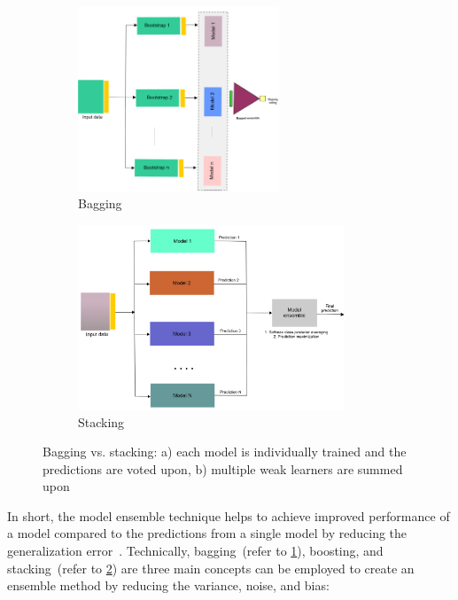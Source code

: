 \begin{figure}[htp!]
	\centering
	\begin{subfigure}{.48\linewidth}
		\centering
		\includegraphics[width=\linewidth,height=55mm]{images/bagging.png}
		\caption{Bagging}
        \label{fig:bagging}
	\end{subfigure}
	\hspace{2mm}
	\begin{subfigure}{0.48\linewidth}
		\centering
		\includegraphics[width=\linewidth,height=55mm]{images/stacking.png}
		\caption{Stacking}
        \label{fig:stacking}
	\end{subfigure}
	\caption{Bagging vs. stacking: a) each model is individually trained and the predictions are voted upon, b) multiple weak learners are summed upon} 
	\label{fig:bagging_and_stacking}
	\vspace{-2mm}
\end{figure}

\hspace*{3.5mm} In short, the model ensemble technique helps to achieve improved performance of a model compared to the predictions from a single model by reducing the generalization error~\cite{karimACCA2019}. Technically, bagging~(refer to \cref{fig:bagging}), boosting, and stacking~(refer to \cref{fig:stacking}) are three main concepts can be employed to create an ensemble method by reducing the variance, noise, and bias: \\

